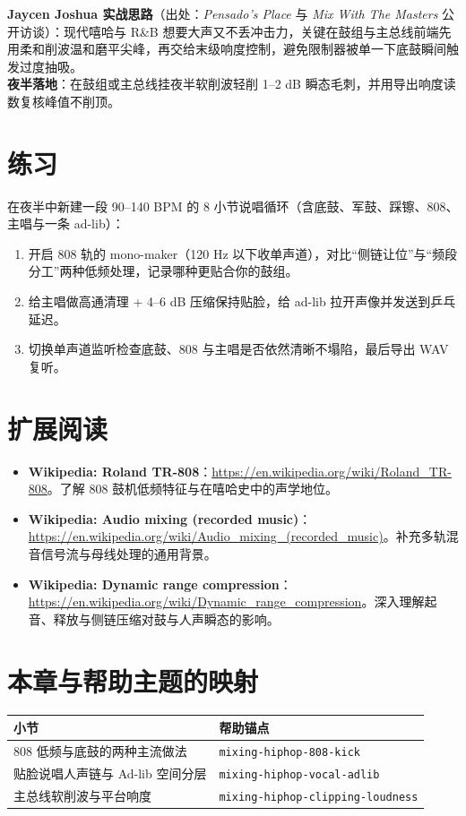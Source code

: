 \begin{tipbox}
\textbf{Jaycen Joshua 实战思路}（出处：\emph{Pensado's Place} 与 \emph{Mix With The Masters} 公开访谈）：现代嘻哈与 R\&B 想要大声又不丢冲击力，关键在鼓组与主总线前端先用柔和削波温和磨平尖峰，再交给末级响度控制，避免限制器被单一下底鼓瞬间触发过度抽吸。\\
\textbf{夜半落地}：在鼓组或主总线挂夜半软削波轻削 1--2 dB 瞬态毛刺，并用导出响度读数复核峰值不削顶。
\end{tipbox}

\section{练习}

\begin{exercise}
在夜半中新建一段 90--140 BPM 的 8 小节说唱循环（含底鼓、军鼓、踩镲、808、主唱与一条 ad-lib）：
\begin{enumerate}
  \item 开启 808 轨的 mono-maker（120 Hz 以下收单声道），对比“侧链让位”与“频段分工”两种低频处理，记录哪种更贴合你的鼓组。
  \item 给主唱做高通清理 + 4--6 dB 压缩保持贴脸，给 ad-lib 拉开声像并发送到乒乓延迟。
  \item 切换单声道监听检查底鼓、808 与主唱是否依然清晰不塌陷，最后导出 WAV 复听。
\end{enumerate}
\end{exercise}

\section*{扩展阅读}
\begin{itemize}
  \item \textbf{Wikipedia: Roland TR-808}：\url{https://en.wikipedia.org/wiki/Roland_TR-808}。了解 808 鼓机低频特征与在嘻哈史中的声学地位。
  \item \textbf{Wikipedia: Audio mixing (recorded music)}：\url{https://en.wikipedia.org/wiki/Audio_mixing_(recorded_music)}。补充多轨混音信号流与母线处理的通用背景。
  \item \textbf{Wikipedia: Dynamic range compression}：\url{https://en.wikipedia.org/wiki/Dynamic_range_compression}。深入理解起音、释放与侧链压缩对鼓与人声瞬态的影响。
\end{itemize}

\section{本章与帮助主题的映射}

\begin{helpmapping}
\begin{tabular}{ll}
\toprule
小节 & 帮助锚点 \\
\midrule
808 低频与底鼓的两种主流做法 & \texttt{mixing-hiphop-808-kick} \\
贴脸说唱人声链与 Ad-lib 空间分层 & \texttt{mixing-hiphop-vocal-adlib} \\
主总线软削波与平台响度 & \texttt{mixing-hiphop-clipping-loudness} \\
\bottomrule
\end{tabular}
\end{helpmapping}
